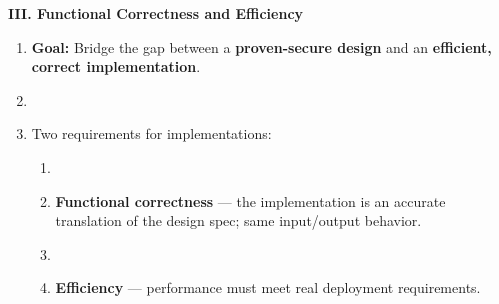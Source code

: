 \documentclass[10pt,aspectratio=1610,compress,dvipsnames]{beamer}
\begin{document}
\begin{frame}[fragile]{\bfseries III. Functional Correctness and Efficiency}{}
\begin{enumerate}[$\bullet$]
	\item {\bfseries\color{cseblue}Goal:}\; Bridge the gap between a \textbf{proven-secure design} and an \textbf{efficient, correct implementation}.
	\item[]
	\item Two requirements for implementations:
	\begin{enumerate}[(1)]
		\item[]
		\item \colorbox{-blue}{\textbf{Functional correctness}} --- the implementation is an accurate translation of the design spec; same input/output behavior.
		\item[]
		\item \colorbox{-blue}{\textbf{Efficiency}} --- performance must meet real deployment requirements. %
	\end{enumerate}
\end{enumerate}
\end{frame}

\end{document}
